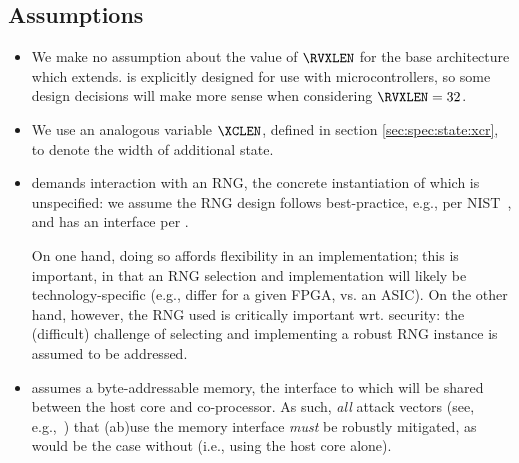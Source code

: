 
\subsection{Assumptions}
\label{sec:bg:assumption}

\begin{itemize}

\item We make no assumption about the value of $\RVXLEN$ for the base
      architecture which \XCID extends.
      \XCID is explicitly designed for use with microcontrollers, so
      some design decisions will make more sense when considering
      $\RVXLEN=32$.

\item We use an analogous variable $\XCLEN$, defined in section
     \ref{sec:spec:state:xcr}, to denote the width of additional \XCID
     state.

\item \XCID demands interaction with an RNG, the concrete instantiation of 
      which is unspecified: we assume the RNG design follows best-practice,
      e.g., per NIST~\cite{SCARV:NIST:SP:800_90a,SCARV:NIST:SP:800_90b,SCARV:NIST:SP:800_90c},
      and has an interface per \cite[Section 6.4]{SCARV:NIST:SP:800_90c}.

      On one hand, doing so affords flexibility in an implementation; this 
      is important, in that an RNG selection and implementation will likely 
      be technology-specific (e.g., differ for a given FPGA, vs. an ASIC).  
      On the other hand, however, the RNG used is critically important wrt. 
      security: the (difficult) challenge of selecting and implementing 
      a robust RNG instance is assumed to be addressed.

\item \XCID assumes a byte-addressable memory, the interface to which will
      be shared between the host core and co-processor.  As such, {\em all}
      attack vectors
      (see, e.g.,~\cite{SCARV:GYCH:18})
      that (ab)use the memory interface {\em must} be robustly mitigated, 
      as would be the case without \XCID (i.e., using the host core alone).

\end{itemize}

